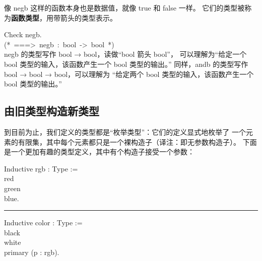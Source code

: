 \documentclass[utf8]{ctexart}
\begin{document}
像 {{negb}} 这样的函数本身也是数据值，就像 {{true}} 和 {{false}} 一样。
它们的类型被称为\textbf{函数类型}，用带箭头的类型表示。

{Check} {negb}.\\
{(*~===\textgreater~negb~:~bool~{{{{-}}\textgreater{}}}~bool~*)}\\

{{negb}} 的类型写作 {{bool}} {→} {{bool}}，读做``{{bool}} 箭头
{{bool}}''， 可以理解为``给定一个 {{bool}} 类型的输入，该函数产生一个
{{bool}} 类型的输出。'' 同样，{{andb}} 的类型写作 {{bool}} {→} {{bool}}
{→} {{bool}}，可以理解为 ``给定两个 {{bool}} 类型的输入，该函数产生一个
{{bool}} 类型的输出。''

\protect\hypertarget{lab27}{}{}

\hypertarget{ux7531ux65e7ux7c7bux578bux6784ux9020ux65b0ux7c7bux578b}{%
\subsection{由旧类型构造新类型}\label{ux7531ux65e7ux7c7bux578bux6784ux9020ux65b0ux7c7bux578b}}

到目前为止，我们定义的类型都是``枚举类型''：它们的定义显式地枚举了
一个元素的有限集，其中每个元素都只是一个裸构造子（译注：即无参数构造子）。
下面是一个更加有趣的类型定义，其中有个构造子接受一个参数：

{Inductive} {rgb} : {Type} :=\\
\hspace*{0.333em}\hspace*{0.333em}\textbar{} {red}\\
\hspace*{0.333em}\hspace*{0.333em}\textbar{} {green}\\
\hspace*{0.333em}\hspace*{0.333em}\textbar{} {blue}.\\

\begin{center}\rule{0.5\linewidth}{\linethickness}\end{center}

{Inductive} {color} : {Type} :=\\
\hspace*{0.333em}\hspace*{0.333em}\textbar{} {black}\\
\hspace*{0.333em}\hspace*{0.333em}\textbar{} {white}\\
\hspace*{0.333em}\hspace*{0.333em}\textbar{} {primary} ({p} : {rgb}).\\
\end{document}
